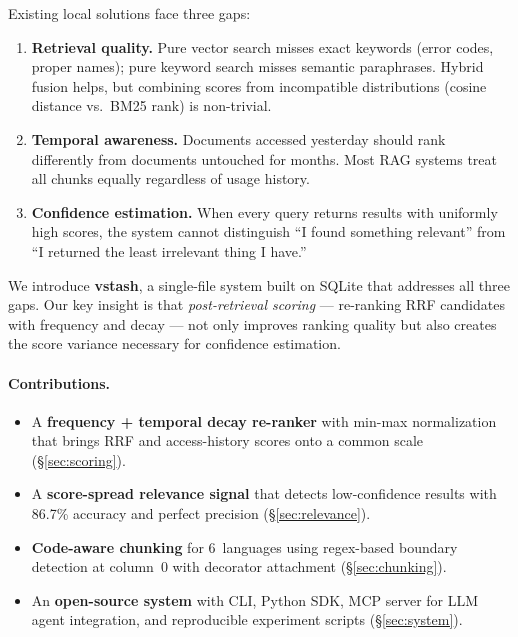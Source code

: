 \documentclass[11pt,a4paper]{article}
\begin{document}
Existing local solutions face three gaps:
\begin{enumerate}
  \item \textbf{Retrieval quality.}  Pure vector search misses exact
    keywords (error codes, proper names); pure keyword search misses
    semantic paraphrases.  Hybrid fusion helps, but combining scores
    from incompatible distributions (cosine distance vs.\ BM25 rank)
    is non-trivial.
  \item \textbf{Temporal awareness.}  Documents accessed yesterday
    should rank differently from documents untouched for months.  Most
    RAG systems treat all chunks equally regardless of usage history.
  \item \textbf{Confidence estimation.}  When every query returns
    results with uniformly high scores, the system cannot distinguish
    ``I found something relevant'' from ``I returned the least
    irrelevant thing I have.''
\end{enumerate}

We introduce \textbf{vstash}, a single-file system built on SQLite that
addresses all three gaps.  Our key insight is that
\emph{post-retrieval scoring} --- re-ranking RRF candidates with
frequency and decay --- not only improves ranking quality but also
creates the score variance necessary for confidence estimation.

\paragraph{Contributions.}
\begin{itemize}
  \item A \textbf{frequency + temporal decay re-ranker} with min-max
    normalization that brings RRF and access-history scores onto a
    common scale (\S\ref{sec:scoring}).
  \item A \textbf{score-spread relevance signal} that detects
    low-confidence results with 86.7\% accuracy and perfect precision
    (\S\ref{sec:relevance}).
  \item \textbf{Code-aware chunking} for 6~languages using regex-based
    boundary detection at column~0 with decorator attachment
    (\S\ref{sec:chunking}).
  \item An \textbf{open-source system} with CLI, Python SDK, MCP server
    for LLM agent integration, and reproducible experiment scripts
    (\S\ref{sec:system}).
\end{itemize}


\end{document}
